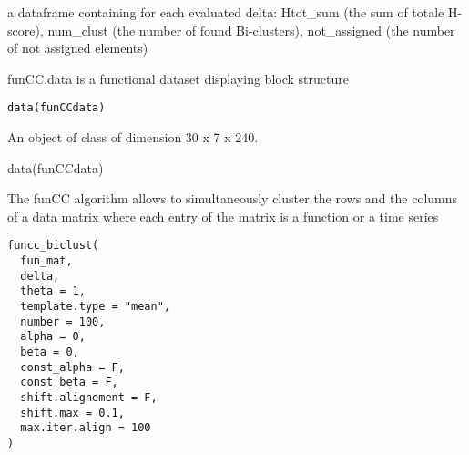 \documentclass[a4paper]{book}
\begin{document}
%
\begin{Value}
a dataframe containing for each evaluated delta: Htot\_sum (the sum of totale H-score), num\_clust (the number of found Bi-clusters), not\_assigned (the number of not assigned elements)
\end{Value}
%
\begin{Description}\relax
funCC.data is a functional dataset displaying block structure
\end{Description}
%
\begin{Usage}
\begin{verbatim}
data(funCCdata)
\end{verbatim}
\end{Usage}
%
\begin{Format}
An object of class  of dimension 30 x 7 x 240.
\end{Format}
%
\begin{Examples}
\begin{ExampleCode}
data(funCCdata)

\end{ExampleCode}
\end{Examples}
%
\begin{Description}\relax
The funCC algorithm allows to simultaneously cluster the rows and the columns of a data matrix where each entry of the matrix is a function or a time series
\end{Description}
%
\begin{Usage}
\begin{verbatim}
funcc_biclust(
  fun_mat,
  delta,
  theta = 1,
  template.type = "mean",
  number = 100,
  alpha = 0,
  beta = 0,
  const_alpha = F,
  const_beta = F,
  shift.alignement = F,
  shift.max = 0.1,
  max.iter.align = 100
)
\end{verbatim}
\end{Usage}
%
\end{document}
